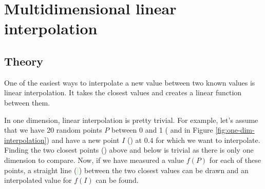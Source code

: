 \section{Multidimensional linear interpolation}

\subsection{Theory}

One of the easiest ways to interpolate a new value between two known values is linear interpolation. It takes the closest values and creates a linear function between them.

In one dimension, linear interpolation is pretty trivial. For example, let's assume that we have 20 random points $P$ between 0 and 1 (\textcolor{Red}{\textbullet} and  \textcolor{Blue}{\textbullet} in Figure \ref{fig:one-dim-interpolation}) and have a new point $I$ (\textcolor{Green}{\textbullet}) at $0.4$ for which we want to interpolate. Finding the two closest points (\textcolor{Red}{\textbullet}) above and below is trivial as there is only one dimension to compare. Now, if we have measured a value $f(P)$ for each of these points, a straight line (\textcolor{LightGreen}{\textbf{|}}) between the two closest values can be drawn and an interpolated value for $f(I)$ can be found. 


